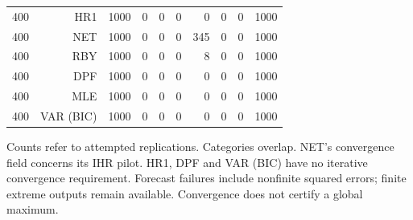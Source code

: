 \begin{table}[p]
\begin{tabular}{rrrrrrrrrr}
400 & HR1 & 1000 & 0 & 0 & 0 &   0 &  0 &  0 & 1000 \\
400 & NET & 1000 & 0 & 0 & 0 & 345 &  0 &  0 & 1000 \\
400 & RBY & 1000 & 0 & 0 & 0 &   8 &  0 &  0 & 1000 \\
400 & DPF & 1000 & 0 & 0 & 0 &   0 &  0 &  0 & 1000 \\
400 & MLE & 1000 & 0 & 0 & 0 &   0 &  0 &  0 & 1000 \\
400 & VAR (BIC) & 1000 & 0 & 0 & 0 &   0 &  0 &  0 & 1000 \\
\bottomrule\end{tabular}
\par\medskip
\begin{minipage}{0.98\linewidth}\footnotesize Counts refer to attempted replications. Categories overlap. NET's convergence field concerns its IHR pilot. HR1, DPF and VAR (BIC) have no iterative convergence requirement. Forecast failures include nonfinite squared errors; finite extreme outputs remain available. Convergence does not certify a global maximum.\end{minipage}
\end{table}
